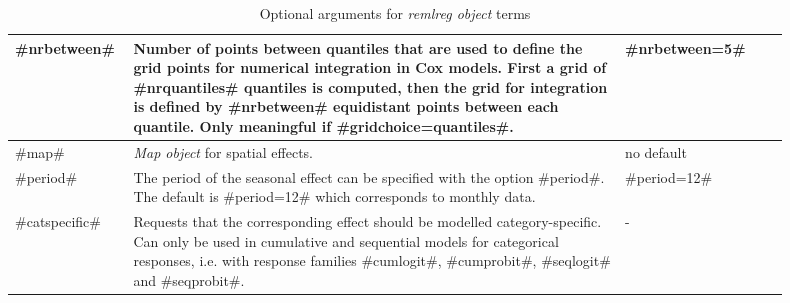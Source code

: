 \begin{table}[ht]
\begin{tabular}{|p{0.1\linewidth}|p{0.6\linewidth}|p{0.2\linewidth}|}
 \hline
 #nrbetween# & Number of points between quantiles that are used to define the grid points for numerical integration in Cox models. First a grid of #nrquantiles# quantiles is computed, then the grid for integration is defined by #nrbetween# equidistant points between each quantile. Only meaningful if #gridchoice=quantiles#.& #nrbetween=5#\\
 \hline
 #map# & {\em Map object} for spatial effects. & no default\\
 \hline
 #period# & The period of the seasonal effect can be specified with the option #period#. The default is #period=12# which corresponds to monthly data. & #period=12# \\
 \hline
 #catspecific# & Requests that the corresponding effect should be modelled category-specific. Can only be used in cumulative and sequential models for categorical responses, i.e. with response families #cumlogit#, #cumprobit#, #seqlogit# and #seqprobit#. & - \\
 \hline
\end{tabular}
{\em \caption{\label{remlregoptions} Optional arguments for {\em
remlreg object} terms}}
\end{table}

